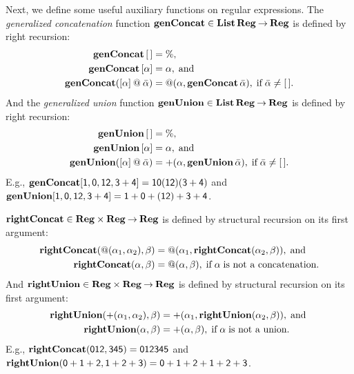 Next, we define some useful auxiliary functions on regular expressions.
The \emph{generalized concatenation} function
$\mathbf{genConcat}\in\mathbf{List}\,\mathbf{Reg}\mathbin{\to}\mathbf{Reg}$ is defined by right recursion:
\begin{align*}
\mathbf{genConcat}\,[\,] &= \% , \\
\mathbf{genConcat}\,[\alpha] &= \alpha , \;\allowbreak\mbox{and}\allowbreak\; \\
\mathbf{genConcat}([\alpha] \mathbin{@} \bar{\alpha}) &=
{@}(\alpha, \mathbf{genConcat}\,\bar{\alpha}) , \;\allowbreak\mbox{if}\allowbreak\; \bar{\alpha}\neq [\,] .
\end{align*}
And the \emph{generalized union} function
$\mathbf{genUnion}\in\mathbf{List}\,\mathbf{Reg}\mathbin{\to}\mathbf{Reg}$ is defined by right recursion:
\begin{align*}
\mathbf{genUnion}\,[\,] &= \% , \\
\mathbf{genUnion}\,[\alpha] &= \alpha , \;\allowbreak\mbox{and}\allowbreak\; \\
\mathbf{genUnion}([\alpha] \mathbin{@} \bar{\alpha}) &=
{+}(\alpha, \mathbf{genUnion}\,\bar{\alpha}) , \;\allowbreak\mbox{if}\allowbreak\; \bar{\alpha}\neq [\,] .
\end{align*}
E.g., $\mathbf{genConcat}[\mathsf{1, 0, 12, 3+4}] = \mathsf{10(12)(3+4)}$ and
$\mathbf{genUnion}[\mathsf{1, 0, 12, 3+4}] = \mathsf{1 + 0 + (12) + 3 + 4}$.

$\mathbf{rightConcat}\in\mathbf{Reg}\times\mathbf{Reg}\mathbin{\to}\mathbf{Reg}$ is defined by
structural recursion on its first argument:
\begin{align*}
\mathbf{rightConcat}({@}(\alpha_1, \alpha_2), \beta) &=
{@}(\alpha_1, \mathbf{rightConcat}(\alpha_2, \beta)) , \;\allowbreak\mbox{and}\allowbreak\;\\
\mathbf{rightConcat}(\alpha, \beta) &= {@}(\alpha, \beta),
\;\allowbreak\mbox{if}\allowbreak\; \alpha \;\allowbreak\mbox{is not a concatenation}\allowbreak.
\end{align*}
And $\mathbf{rightUnion}\in\mathbf{Reg}\times\mathbf{Reg}\mathbin{\to}\mathbf{Reg}$ is defined by
structural recursion on its first argument:
\begin{align*}
\mathbf{rightUnion}({+}(\alpha_1, \alpha_2), \beta) &=
{+}(\alpha_1, \mathbf{rightUnion}(\alpha_2, \beta)) , \;\allowbreak\mbox{and}\allowbreak\; \\
\mathbf{rightUnion}(\alpha, \beta) &= {+}(\alpha, \beta),
\;\allowbreak\mbox{if}\allowbreak\; \alpha \;\allowbreak\mbox{is not a union}\allowbreak.
\end{align*}
E.g., $\mathbf{rightConcat}(\mathsf{012}, \mathsf{345}) =
\mathsf{012345}$ and $\mathbf{rightUnion}(\mathsf{0 + 1 + 2}, \mathsf{1 + 2 + 3}) =
\mathsf{0 + 1 + 2 + 1 + 2 + 3}$.

